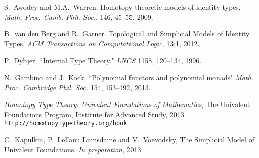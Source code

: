 \documentclass[11pt]{article}
\theoremstyle{remark}
\theoremstyle{definition}
\begin{document}
\begin{thebibliography}{300}

S.~Awodey and M.A.~Warren. Homotopy theoretic models of identity types. \emph{Math. Proc. Camb. Phil. Soc.}, 146, 45--55, 2009.

B.~van den Berg and R.~Garner. Topological and Simplicial Models of Identity Types. \emph{ACM Transactions on Computational Logic}, 13:1, 2012.

P.~Dybjer. ``Internal Type Theory." \emph{LNCS} 1158, 120--134, 1996.

N.~Gambino and J.~Kock, ``Polynomial functors and polynomial monads"
\emph{Math. Proc. Cambridge Phil. Soc.} 154, 153--192, 2013.


\emph{Homotopy Type Theory: Univalent Foundations of Mathematics}, The Univalent Foundations Program, Institute for Advanced Study, 2013. {\tt http://homotopytypetheory.org/book}

C.~Kapulkin, P.~LeFanu Lumsdaine and V.~Voevodsky, The Simplicial Model of Univalent Foundations. \emph{In preparation}, 2013.

%
\end{thebibliography}

\end{document}
